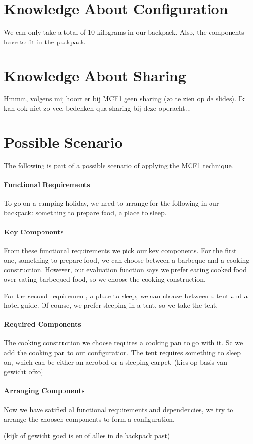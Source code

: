\documentclass[a4paper,11pt]{article}
\begin{document}
\section*{Knowledge About Configuration}

We can only take a total of 10 kilograms in our backpack.
Also, the components have to fit in the packpack.


\section*{Knowledge About Sharing}

Hmmm, volgens mij hoort er bij MCF1 geen sharing (zo te zien
op de slides). Ik kan ook niet zo veel bedenken qua sharing
bij deze opdracht...


\section*{Possible Scenario}

The following is part of a possible scenario of applying the
MCF1 technique.

\paragraph{Functional Requirements}

To go on a camping holiday, we need to arrange for the following
in our backpack: something to prepare food, a place to sleep.

\paragraph{Key Components}

From these functional requirements we pick our key components. For
the first one, something to prepare food, we can choose between a
barbeque and a cooking construction. However, our evaluation
function says we prefer eating cooked food over eating barbequed
food, so we choose the cooking construction.

For the second requirement, a place to sleep, we can choose between
a tent and a hotel guide. Of course, we prefer sleeping in a tent,
so we take the tent.

\paragraph{Required Components}

The cooking construction we choose requires a cooking pan to go
with it. So we add the cooking pan to our configuration. The tent
requires something to sleep on, which can be either an aerobed or
a sleeping carpet. (kies op basis van gewicht ofzo)

\paragraph{Arranging Components}

Now we have satified al functional requirements and dependencies,
we try to arrange the choosen components to form a configuration.

(kijk of gewicht goed is en of alles in de backpack past)
\end{document}
